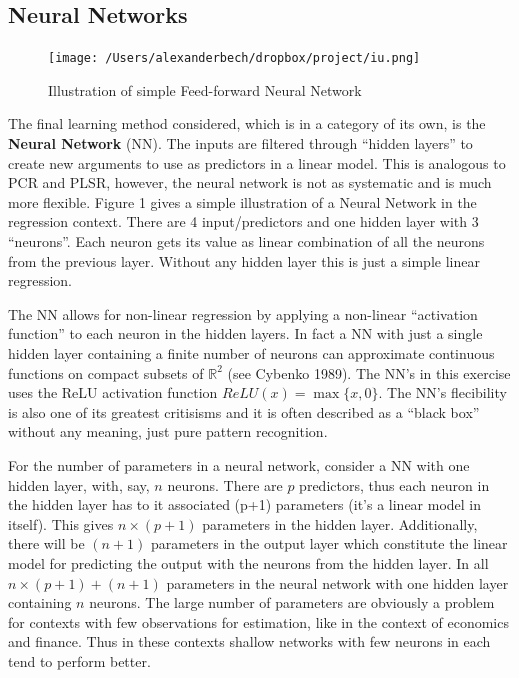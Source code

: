 \documentclass[]{article}
\begin{document}
\hypertarget{neural-networks}{%
\subsection{Neural Networks}\label{neural-networks}}

\begin{figure}
    \texttt{[image: /Users/alexanderbech/dropbox/project/iu.png]}
  \caption{Illustration of simple Feed-forward Neural Network}
\end{figure}

The final learning method considered, which is in a category of its own,
is the \textbf{Neural Network} (NN). The inputs are filtered through
``hidden layers'' to create new arguments to use as predictors in a
linear model. This is analogous to PCR and PLSR, however, the neural
network is not as systematic and is much more flexible. Figure 1 gives a
simple illustration of a Neural Network in the regression context. There
are 4 input/predictors and one hidden layer with 3 ``neurons''. Each
neuron gets its value as linear combination of all the neurons from the
previous layer. Without any hidden layer this is just a simple linear
regression.

The NN allows for non-linear regression by applying a non-linear
``activation function'' to each neuron in the hidden layers. In fact a
NN with just a single hidden layer containing a finite number of neurons
can approximate continuous functions on compact subsets of
\(\mathbb{R}^2\) (see Cybenko 1989). The NN's in this exercise uses the
ReLU activation function \(ReLU(x) = \max\{x,0\}\). The NN's flecibility
is also one of its greatest critisisms and it is often described as a
``black box'' without any meaning, just pure pattern recognition.

For the number of parameters in a neural network, consider a NN with one
hidden layer, with, say, \(n\) neurons. There are \(p\) predictors, thus
each neuron in the hidden layer has to it associated (p+1) parameters
(it's a linear model in itself). This gives \(n \times(p+1)\) parameters
in the hidden layer. Additionally, there will be \((n+1)\) parameters in
the output layer which constitute the linear model for predicting the
output with the neurons from the hidden layer. In all
\(n \times(p+1) + (n+1)\) parameters in the neural network with one
hidden layer containing \(n\) neurons. The large number of parameters
are obviously a problem for contexts with few observations for
estimation, like in the context of economics and finance. Thus in these
contexts shallow networks with few neurons in each tend to perform
better.
\end{document}
